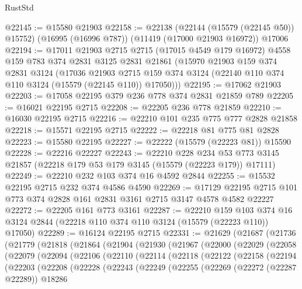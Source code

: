 \begin{lexlean}{RustStd}
\begin{coremodule}
@22145 := @15580 @21903
@22158 := @22138
    (@22144 (@15579 (@22145 @50)) @15752)
    (@16995 (@16996 @787))
    (@11419 (@17000 @21903 @16972))
    @17006
@22194 := @17011
    @21903
    @2715
    @2715
    (@17015 @4549 @179 @16972)
    @4558
    @159
    @783
    @374
    @2831
    @3125
    @2831
    @21861
    (@15970
      @21903
      @159
      @374
      @2831
      @3124
      (@17036
        @21903
        @2715
        @159
        @374
        @3124
        (@22140 @110 @374 @110 @3124 (@15579 (@22145 @110)) @17050)))
@22195 := @17062 @21903
@22203 := @17058 @22195 @379 @236 @778 @374 @2831 @21859 @789
@22205 := @16021 @22195 @2715
@22208 := @22205 @236 @778 @21859
@22210 := @16030 @22195 @2715
@22216 := @22210 @101 @235 @775 @777 @2828 @21858
@22218 := @15571 @22195 @2715
@22222 := @22218 @81 @775 @81 @2828
@22223 := @15580 @22195
@22227 := @22222 (@15579 (@22223 @81)) @15590
@22228 := @22216 @22227
@22243 := @22210
    @228
    @234
    @53
    @773
    @3145
    @21857
    (@22218 @179 @53 @179 @3145 (@15579 (@22223 @179)) @17111)
@22249 := @22210 @232 @103 @374 @16 @4592 @2844
@22255 := @15532 @22195 @2715 @232 @374 @4586 @4590
@22269 := @17129 @22195 @2715 @101 @773 @374 @2828 @161 @2831 @3161 @2715 @3147 @4578 @4582 @22227
@22272 := @22205 @161 @773 @3161
@22287 := @22210
    @159
    @103
    @374
    @16
    @3124
    @2844
    (@22218 @110 @374 @110 @3124 (@15579 (@22223 @110)) @17050)
@22289 := @16124 @22195 @2715
@22331 := @21629
    (@21687
      (@21736
        (@21779
          (@21818
            (@21864
              (@21904
                (@21930
                  (@21967
                    (@22000
                      (@22029
                        (@22058
                          (@22079
                            (@22094
                              (@22106
                                (@22110
                                  (@22114
                                    (@22118
                                      (@22122
                                        (@22158
                                          (@22194
                                            (@22203
                                              (@22208
                                                (@22228
                                                  (@22243
                                                    (@22249
                                                      (@22255
                                                        (@22269
                                                          (@22272 (@22287 @22289))
                                                          @18286

\end{coremodule}
\end{lexlean}
